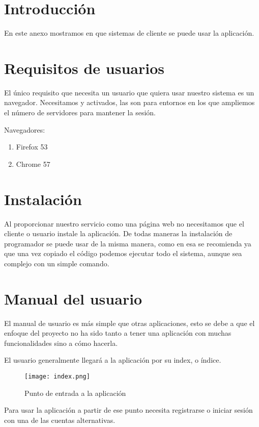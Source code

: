 
\section{Introducción}
En este anexo mostramos en que sistemas de cliente se puede usar la aplicación.

\section{Requisitos de usuarios}
El único requisito que necesita un usuario que quiera usar nuestro sistema es un navegador. Necesitamos  y  activados, las  son para entornos en los que ampliemos el número de servidores para mantener la sesión.

Navegadores:
\begin{enumerate}
\item Firefox 53
\item Chrome 57
\end{enumerate}


\section{Instalación}
Al proporcionar nuestro servicio como una página web no necesitamos que el cliente o usuario instale la aplicación. De todas maneras la instalación de programador se puede usar de la misma manera, como en esa se recomienda  ya que una vez copiado el código podemos ejecutar todo el sistema, aunque sea complejo con un simple comando.

\section{Manual del usuario}
El manual de usuario es más simple que otras aplicaciones, esto se debe a que el enfoque del proyecto no ha sido tanto a tener una aplicación con muchas funcionalidades sino a cómo hacerla.

El usuario generalmente llegará a la aplicación por su index, o índice.

\begin{figure}
	\centering
	\texttt{[image: index.png]}
	\caption{Punto de entrada a la aplicación}\label{fig:index.png}
\end{figure}

Para usar la aplicación a partir de ese punto necesita registrarse o iniciar sesión con una de las cuentas alternativas.

